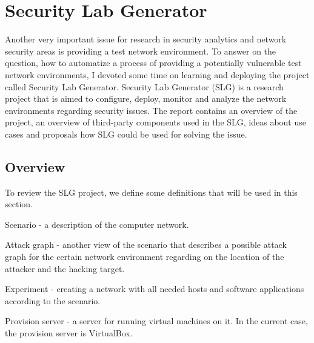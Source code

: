 %


\section{Security Lab Generator}
Another very important issue for research in security analytics and network security areas is providing a test network environment. To answer on the question, how to automatize a process of providing a potentially vulnerable test network environments, I devoted some time on learning and deploying the project called Security Lab Generator. Security Lab Generator (SLG) is a research project that is aimed to configure, deploy, monitor and analyze the network environments regarding security issues. The report contains an overview of the project, an overview of third-party components used in the SLG, ideas about use cases and proposals how SLG could be used for solving the issue.

\subsection{Overview}

To review the SLG project, we define some definitions that will be used in this section. 

\begin{compactitem}
\item Scenario - a description of the computer network. 
\item Attack graph - another view of the scenario that describes a possible attack graph for the certain network environment regarding on the location of the attacker and the hacking target.   
\item Experiment - creating a network with all needed hosts and software applications according to the scenario.
\item Provision server - a server for running virtual machines on it. In the current case, the provision server is VirtualBox.
\end{compactitem}

